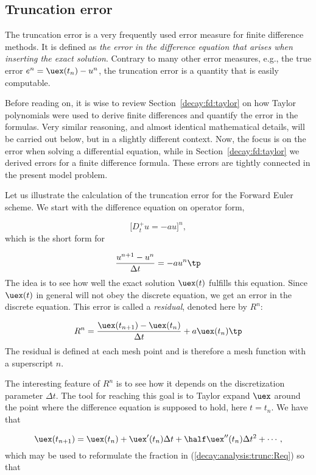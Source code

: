 \documentclass[graybox,sectrefs,envcountresetchap,open=right,final]{svmonodo}
\begin{document}
\subsection{Truncation error}
\label{decay:analysis:trunc}

The truncation error is a very frequently used error measure for
finite difference methods. It is defined as \emph{the error
in the difference equation that arises when inserting the exact
solution}. Contrary to many other error measures, e.g., the
true error $e^n=\uex(t_n)-u^n$, the truncation error is a quantity that
is easily computable.

Before reading on, it is wise to review Section~\ref{decay:fd:taylor}
on how Taylor polynomials were used to derive finite differences and
quantify the error in the formulas. Very similar reasoning, and almost
identical mathematical details, will be carried out below, but in a slightly
different context. Now, the
focus is on the error when solving a differential
equation, while in Section~\ref{decay:fd:taylor} we derived
errors for a finite difference formula. These errors are tightly
connected in the present model problem.

Let us illustrate the calculation of the truncation error
for the Forward Euler scheme.
We start with the difference equation on operator form,

\[ \lbrack D_t^+ u = -au\rbrack^n,\]
which is the short form for

\[ \frac{u^{n+1}-u^n}{\Delta t} = -au^n\tp\]
The idea is to see how well the exact solution $\uex(t)$ fulfills
this equation. Since $\uex(t)$ in general will not obey the
discrete equation, we get an error in the discrete equation. This
error is called
a \emph{residual}, denoted here by $R^n$:

\begin{equation}
R^n = \frac{\uex(t_{n+1})-\uex(t_n)}{\Delta t} + a\uex(t_n)
\tp
\label{decay:analysis:trunc:Req}
\end{equation}
The residual is defined at each mesh point and is therefore a mesh
function with a superscript $n$.

The interesting feature of $R^n$ is to see how it
depends on the discretization parameter $\Delta t$.
The tool for reaching
this goal is to Taylor expand $\uex$ around the point where the
difference equation is supposed to hold, here $t=t_n$.
We have that

\[ \uex(t_{n+1}) = \uex(t_n) + \uex'(t_n)\Delta t + \half\uex''(t_n)
\Delta t^2 + \cdots, \]
which may be used to reformulate the fraction in
(\ref{decay:analysis:trunc:Req}) so that
\end{document}
